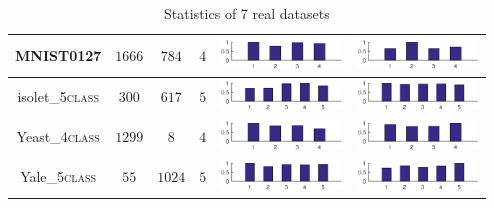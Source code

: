 \begin{table}[!htbp]
{\begin{tabular}{|c|c|c|c|c|c|}
MNIST0127 & $1666$ & $784$ & $4$ & \begin{minipage}{0.2\textwidth}\centering\includegraphics[height=8mm]{figure/mnist_size.eps}\end{minipage} & \begin{minipage}{0.2\textwidth}\centering\includegraphics[height=8mm]{figure/mnist_den.eps}\end{minipage} \\ \hline
isolet\_5\textsc{class}&$300$ & $617$ & $5$ & \begin{minipage}{0.2\textwidth}\centering\includegraphics[height=8mm]{figure/isolet_size.eps}\end{minipage} & \begin{minipage}{0.2\textwidth}\centering\includegraphics[height=8mm]{figure/isolet_den.eps}\end{minipage}\\ \hline
Yeast\_4\textsc{class}&$1299$ & $8$ & $4$ & \begin{minipage}{0.2\textwidth}\centering\includegraphics[height=8mm]{figure/yeast_size.eps}\end{minipage} & \begin{minipage}{0.2\textwidth}\centering\includegraphics[height=8mm]{figure/yeast_den.eps}\end{minipage}\\ \hline
Yale\_5\textsc{class}&$55$ & $1024$ & $5$ & \begin{minipage}{0.2\textwidth}\centering\includegraphics[height=8mm]{figure/yale_size.eps}\end{minipage} & \begin{minipage}{0.2\textwidth}\centering\includegraphics[height=8mm]{figure/yale_den.eps}\end{minipage} \\ \hline
\end{tabular}
}
\caption{Statistics of 7 real datasets}
\label{table:des_real}
\end{table}

